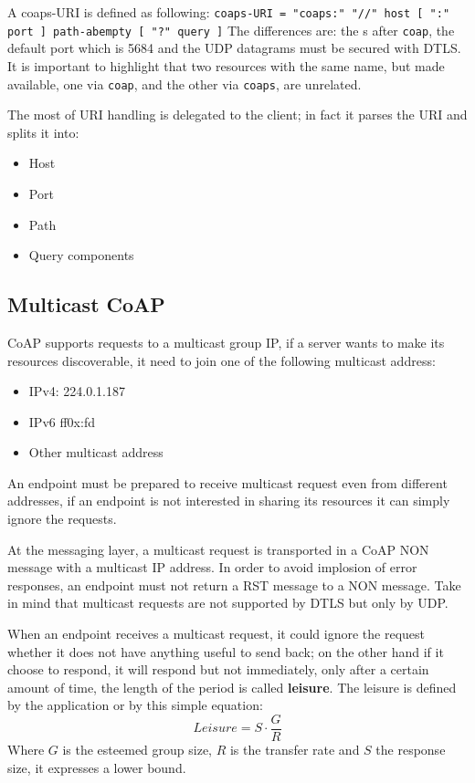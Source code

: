 	A coaps-URI is defined as following:
	\texttt{coaps-URI = "coaps:" "//" host [ ":" port ] path-abempty [ "?" query ]}
	The differences are: the s after \texttt{coap}, the default port which is 5684 and the UDP datagrams must be secured with DTLS.
	It is important to highlight that two resources with the same name, but made available, one via \texttt{coap}, and the other via \texttt{coaps}, are unrelated.
	
	The most of URI handling is delegated to the client; in fact it parses the URI and splits it into:\newline
	\begin{itemize}
		\item Host
		\item Port
		\item Path
		\item Query components
	\end{itemize}
	
	\subsection{Multicast CoAP}
	CoAP supports requests to a multicast group IP, if a server wants to make its resources discoverable, it need to join one of the following multicast address:
	\begin{itemize}
		\item IPv4: 224.0.1.187
		\item IPv6 ff0x:fd
		\item Other multicast address
	\end{itemize}

	An endpoint must be prepared to receive multicast request even from different addresses, if an endpoint is not interested in sharing its resources it can simply ignore the requests.\newline
	
	At the messaging layer, a multicast request is transported in a CoAP NON message with a multicast IP address.\newline
	In order to avoid implosion of error responses, an endpoint must not return a RST message to a NON message.\newline
	Take in mind that multicast requests are not supported by DTLS but only by UDP.\newline
	
	When an endpoint receives a multicast request, it could ignore the request whether it does not have anything useful to send back; on the other hand if it choose to respond, it will respond but not immediately, only after a certain amount of time, the length of the period is called \textbf{leisure}.\newline
	The leisure is defined by the application or by this simple equation:
	\begin{equation}Leisure=S\cdot\frac{G}{R}\end{equation}
	Where $G$ is the esteemed group size, $R$ is the transfer rate and $S$ the response size, it expresses a lower bound.\newline
	
